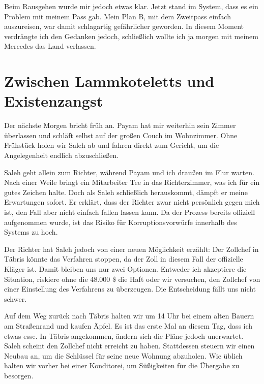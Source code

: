 Beim Rausgehen wurde mir jedoch etwas klar. Jetzt stand im System, dass es ein Problem mit meinem Pass gab. Mein Plan B, mit dem Zweitpass einfach auszureisen, war damit schlagartig gefährlicher geworden. In diesem Moment verdrängte ich den Gedanken jedoch, schließlich wollte ich ja morgen mit meinem Mercedes das Land verlassen.

\chapter*{Zwischen Lammkoteletts und Existenzangst}

Der nächste Morgen bricht früh an. Payam hat mir weiterhin sein Zimmer überlassen und schläft selbst auf der großen Couch im Wohnzimmer. Ohne Frühstück holen wir Saleh ab und fahren direkt zum Gericht, um die Angelegenheit endlich abzuschließen.

Saleh geht allein zum Richter, während Payam und ich draußen im Flur warten. Nach einer Weile bringt ein Mitarbeiter Tee in das Richterzimmer, was ich für ein gutes Zeichen halte. Doch als Saleh schließlich herauskommt, dämpft er meine Erwartungen sofort. Er erklärt, dass der Richter zwar nicht persönlich gegen mich ist, den Fall aber nicht einfach fallen lassen kann. Da der Prozess bereits offiziell aufgenommen wurde, ist das Risiko für Korruptionsvorwürfe innerhalb des Systems zu hoch.

Der Richter hat Saleh jedoch von einer neuen Möglichkeit erzählt: Der Zollchef in Täbris könnte das Verfahren stoppen, da der Zoll in diesem Fall der offizielle Kläger ist. Damit bleiben uns nur zwei Optionen. Entweder ich akzeptiere die Situation, riskiere ohne die 48.000 \$ die Haft oder wir versuchen, den Zollchef von einer Einstellung des Verfahrens zu überzeugen. Die Entscheidung fällt uns nicht schwer.

Auf dem Weg zurück nach Täbris halten wir um 14 Uhr bei einem alten Bauern am Straßenrand und kaufen Äpfel. Es ist das erste Mal an diesem Tag, dass ich etwas esse. In Täbris angekommen, ändern sich die Pläne jedoch unerwartet. Saleh scheint den Zollchef nicht erreicht zu haben. Stattdessen steuern wir einen Neubau an, um die Schlüssel für seine neue Wohnung abzuholen. Wie üblich halten wir vorher bei einer Konditorei, um Süßigkeiten für die Übergabe zu besorgen.

